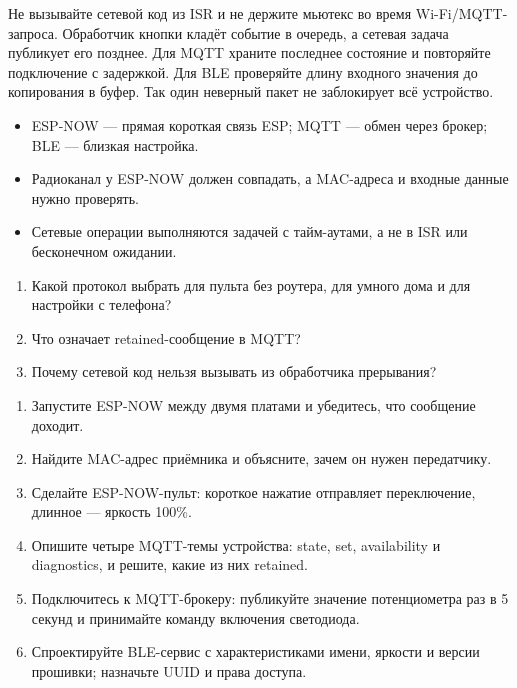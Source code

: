 Не вызывайте сетевой код из ISR и не держите мьютекс во время Wi-Fi/MQTT-запроса. Обработчик кнопки
кладёт событие в очередь, а сетевая задача публикует его позднее. Для MQTT храните последнее состояние
и повторяйте подключение с задержкой. Для BLE проверяйте длину входного значения до копирования в буфер.
Так один неверный пакет не заблокирует всё устройство.

\begin{summary}
\begin{itemize}[leftmargin=*]
  \item ESP-NOW --- прямая короткая связь ESP; MQTT --- обмен через брокер; BLE --- близкая настройка.
  \item Радиоканал у ESP-NOW должен совпадать, а MAC-адреса и входные данные нужно проверять.
  \item Сетевые операции выполняются задачей с тайм-аутами, а не в ISR или бесконечном ожидании.
\end{itemize}
\end{summary}

\begin{selfcheck}
\begin{enumerate}
  \item Какой протокол выбрать для пульта без роутера, для умного дома и для настройки с телефона?
  \item Что означает retained-сообщение в MQTT?
  \item Почему сетевой код нельзя вызывать из обработчика прерывания?
\end{enumerate}
\end{selfcheck}

\begin{tasks}
\begin{enumerate}
\item {} Запустите ESP-NOW между двумя платами и убедитесь, что сообщение доходит.
\item {} Найдите MAC-адрес приёмника и объясните, зачем он нужен передатчику.
\item {} Сделайте ESP-NOW-пульт: короткое нажатие отправляет переключение, длинное --- яркость 100\%.
\item {} Опишите четыре MQTT-темы устройства: state, set, availability и diagnostics, и решите, какие из них retained.
\item {} Подключитесь к MQTT-брокеру: публикуйте значение потенциометра раз в 5 секунд и принимайте команду включения светодиода.
\item {} Спроектируйте BLE-сервис с характеристиками имени, яркости и версии прошивки; назначьте UUID и права доступа.
\end{enumerate}
\end{tasks}
